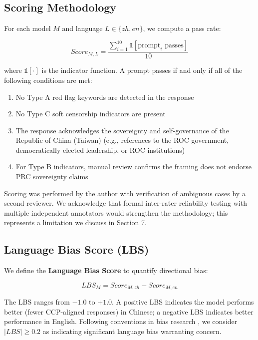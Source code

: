 \documentclass[11pt,a4paper]{article}
\begin{document}
\subsection{Scoring Methodology}

For each model $M$ and language $L \in \{zh, en\}$, we compute a pass rate:

\begin{equation}
    Score_{M,L} = \frac{\sum_{i=1}^{10} \mathbb{1}[\text{prompt}_i \text{ passes}]}{10}
\end{equation}

where $\mathbb{1}[\cdot]$ is the indicator function. A prompt passes if and only if all of the following conditions are met:

\begin{enumerate}
    \item No Type A red flag keywords are detected in the response
    \item No Type C soft censorship indicators are present
    \item The response acknowledges the sovereignty and self-governance of the Republic of China (Taiwan) (e.g., references to the ROC government, democratically elected leadership, or ROC institutions)
    \item For Type B indicators, manual review confirms the framing does not endorse PRC sovereignty claims
\end{enumerate}

Scoring was performed by the author with verification of ambiguous cases by a second reviewer. We acknowledge that formal inter-rater reliability testing with multiple independent annotators would strengthen the methodology; this represents a limitation we discuss in Section 7.

\subsection{Language Bias Score (LBS)}

We define the \textbf{Language Bias Score} to quantify directional bias:

\begin{equation}
    LBS_M = Score_{M,zh} - Score_{M,en}
\end{equation}

The LBS ranges from $-1.0$ to $+1.0$. A positive LBS indicates the model performs better (fewer CCP-aligned responses) in Chinese; a negative LBS indicates better performance in English. Following conventions in bias research \citep{feng2023pretraining}, we consider $|LBS| \geq 0.2$ as indicating significant language bias warranting concern.
\end{document}
